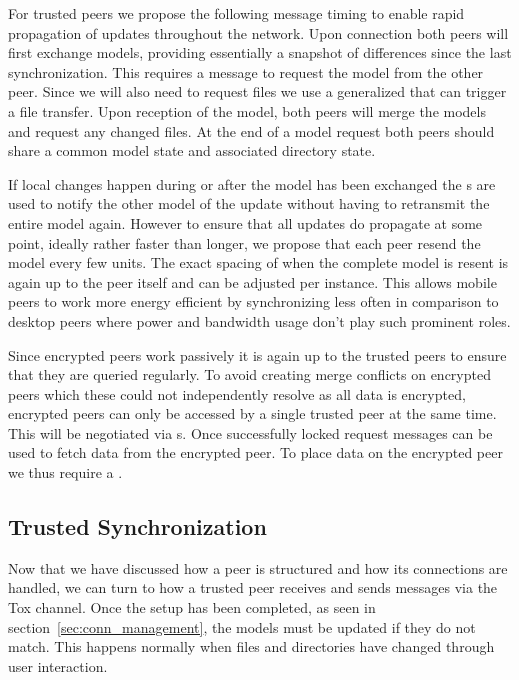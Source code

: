 For trusted peers we propose the following message timing to enable rapid propagation of updates throughout the network.
Upon connection both peers will first exchange models, providing essentially a snapshot of differences since the last synchronization.
This requires a message to request the model from the other peer.
Since we will also need to request files we use a generalized  that can trigger a file transfer.
Upon reception of the model, both peers will merge the models and request any changed files.
At the end of a model request both peers should share a common model state and associated directory state.

If local changes happen during or after the model has been exchanged the s are used to notify the other model of the update without having to retransmit the entire model again.
However to ensure that all updates do propagate at some point, ideally rather faster than longer, we propose that each peer resend the model every few units.
The exact spacing of when the complete model is resent is again up to the peer itself and can be adjusted per instance.
This allows mobile peers to work more energy efficient by synchronizing less often in comparison to desktop peers where power and bandwidth usage don't play such prominent roles.

Since encrypted peers work passively it is again up to the trusted peers to ensure that they are queried regularly.
To avoid creating merge conflicts on encrypted peers which these could not independently resolve as all data is encrypted, encrypted peers can only be accessed by a single trusted peer at the same time.
This will be negotiated via s.
Once successfully locked request messages can be used to fetch data from the encrypted peer.
To place data on the encrypted peer we thus require a .

\subsection{Trusted Synchronization}
\label{sub:Trusted Synchronization}

Now that we have discussed how a peer is structured and how its connections are handled, we can turn to how a trusted peer receives and sends messages via the Tox channel.
Once the setup has been completed, as seen in section~\ref{sec:conn_management}, the models must be updated if they do not match.
This happens normally when files and directories have changed through user interaction.

